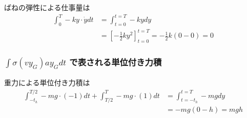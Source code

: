 \documentclass[a4paper,11pt]{jsarticle}
\begin{document}
ばねの弾性による仕事量は
\begin{align}
  \int_{0}^{T} -ky \cdot \dot{y} dt
   & = \int_{t=0}^{t=T} -kydy
  \\
   & = \left[ -\frac{1}{2} ky^2 \right]_{t=0}^{t=T}
  = -\frac{1}{2}k (0 - 0) = 0
\end{align}

\subsubsection{$\int\sigma (vy_G)ay_G dt$ で表される単位付き力積}
重力による単位付き力積は
\begin{align}
  \int_{-t_h}^{T/2} -mg \cdot (-1) dt
  + \int_{T/2}^{T} -mg \cdot (1) dt
   & = \int_{t=-t_h}^{t=T} -mgdy
  \\
   & = -mg(0 - h) = mgh
\end{align}
\end{document}
